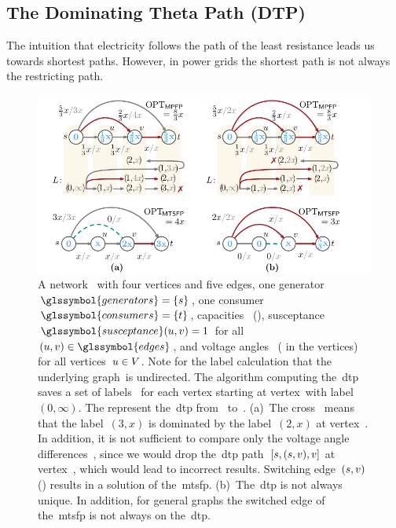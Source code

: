 \subsection{The Dominating Theta Path (DTP)}
\label{ch:switching:sec:exploit_structural_characteristics:subsec:dtp}
% 
The intuition that electricity follows the path of the least resistance leads us
towards shortest paths. However, in power grids the shortest path is not always
the restricting path.%
%
\begin{figure}[tb!]
    \centering\includegraphics{switchplacement/figures/comparing_delta_theta_path.pdf}
    \caption[An example and counterexample for the~\gls{dtp} calculation.]
    {%
    A network~ with four vertices and five edges, one
    generator~$\glssymbol{generators}=\{\source\}$, one
    consumer~$\glssymbol{consumers}=\{\sink\}$,
    capacities~
    \mbox{()}, susceptance~$\glssymbol{susceptance}
    (\vertexa,\vertexb)=1$ for all $(\vertexa,\vertexb)\in\glssymbol{edges}$,
    and voltage angles~
    ( in the vertices) for all
    vertices~$u\in V$. Note for the label calculation that the
    underlying graph~\graph is undirected. The algorithm computing the~\gls{dtp}
    saves a set of labels~ for each vertex
    starting at vertex~\source with label~$(0,\infty)$. The 
     represent the~\gls{dtp} from~\source
    to~\sink. (a)~The cross~ means that the
    label~$(3,x)$ is dominated by the label~$(2,x)$ at vertex~\sink. In
    addition, it is not sufficient to compare only the voltage angle
    differences~, since we would drop
    the~\gls{dtp} path~$[s, (s,v),v]$ at
    vertex~\vertexb, which would lead to incorrect results. Switching
    edge~$(s,v)$ ()
    results in a solution of the~\gls{mtsfp}. (b)~The~\gls{dtp} is not always
    unique. In addition, for general graphs the switched edge of the~\gls{mtsfp}
    is not always on the~\gls{dtp}. }%
    \label{fig:comparing_delta_theta_path} 
\end{figure}
